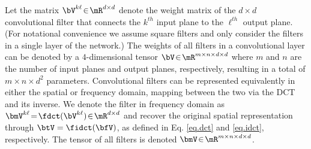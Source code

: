 \documentclass{article} %
\begin{document}
Let the matrix $\bV^{k\ell}\!\in\!\mR^{d\times d}$ denote the weight matrix of the $d\!\times\! d$ convolutional filter that connects the $k^{th}$ input plane to the $\ell^{th}$ output plane.
(For notational convenience we assume square filters and only consider the filters in a single layer of the network.)
The weights of all filters in a convolutional layer can be denoted by a $4$-dimensional tensor $\bV\!\in\!\mR^{m\times n\times d \times d}$ where $m$ and $n$ are the number of input planes and output planes, respectively, resulting in a total of $m\times n\times d^2$ parameters.
Convolutional filters can be represented equivalently in either the spatial or frequency domain, mapping between the two via the DCT and its inverse.
We denote the filter in frequency domain as $\bmV^{k\ell} \!=\! \fdct(\bV^{k\ell})\!\in\!\mR^{d\times d}$ and recover the original spatial representation through $\btV = \fidct(\bfV)$, as defined in Eq. \eqref{eq.dct} and \eqref{eq.idct}, respectively.
The tensor of all filters is denoted $\bmV\!\in\!\mR^{m\times n\times d \times d}$.
\end{document}
